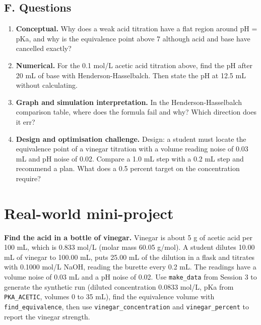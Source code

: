 \documentclass[11pt,a4paper]{article}
\begin{document}
\subsection*{F. Questions}
\begin{enumerate}[nosep]
\item \textbf{Conceptual.} Why does a weak acid titration have a flat region around pH = pKa, and why is the equivalence point above 7 although acid and base have cancelled exactly?
\item \textbf{Numerical.} For the 0.1 mol/L acetic acid titration above, find the pH after 20 mL of base with Henderson-Hasselbalch. Then state the pH at 12.5 mL without calculating.
\item \textbf{Graph and simulation interpretation.} In the Henderson-Hasselbalch comparison table, where does the formula fail and why? Which direction does it err?
\item \textbf{Design and optimisation challenge.} Design: a student must locate the equivalence point of a vinegar titration with a volume reading noise of 0.03 mL and pH noise of 0.02. Compare a 1.0 mL step with a 0.2 mL step and recommend a plan. What does a 0.5 percent target on the concentration require?
\end{enumerate}

\section{Real-world mini-project}
\textbf{Find the acid in a bottle of vinegar.} Vinegar is about 5 g of acetic acid per 100 mL, which is 0.833 mol/L (molar mass 60.05 g/mol). A student dilutes 10.00 mL of vinegar to 100.00 mL, puts 25.00 mL of the dilution in a flask and titrates with 0.1000 mol/L NaOH, reading the burette every 0.2 mL. The readings have a volume noise of 0.03 mL and a pH noise of 0.02. Use \texttt{make\_data} from Session 3 to generate the synthetic run (diluted concentration 0.0833 mol/L, pKa from \texttt{PKA\_ACETIC}, volumes 0 to 35 mL), find the equivalence volume with \texttt{find\_equivalence}, then use \texttt{vinegar\_concentration} and \texttt{vinegar\_percent} to report the vinegar strength.
\end{document}
